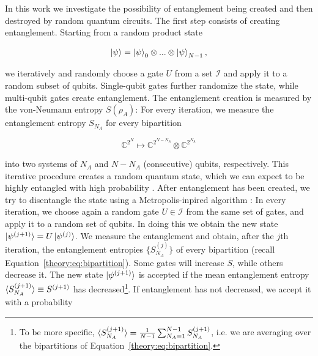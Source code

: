 \documentclass[reprint,amsmath,amssymb,aps,prb,nofootinbib]{revtex4-2}
\begin{document}
    \vspace{\baselineskip}

    In this work we investigate the possibility of entanglement being created and then destroyed by
    random quantum circuits. The first step consists of creating entanglement. Starting from a random product state

    \begin{equation}
        \ket{\psi}=\ket{\psi}_0\otimes...\otimes\ket{\psi}_{N-1},
    \end{equation}

    we iteratively and randomly choose a gate $U$ from a set $\mathcal{I}$ and apply it to a random subset of
    qubits. Single-qubit gates further randomize the state, while multi-qubit gates create entanglement. The
    entanglement creation is measured by the von-Neumann entropy $S(\rho_A)$: For every iteration, we measure
    the entanglement entropy $S_{N_A}$ for every bipartition

    \begin{equation}
        \mathbb{C}^{2^N}\mapsto\mathbb{C}^{2^{N-N_A}}\otimes\mathbb{C}^{2^{N_A}}
        \label{theory:eq:bipartition}
    \end{equation}

    into two systems of $N_A$ and $N-N_A$ (consecutive) qubits, respectively. This iterative procedure creates a random quantum state, which we can
    expect to be highly entangled with high probability \cite{Page:1993:AverageEntropy,Hamma:2012:RandomQuantumEntanglement}.
    After entanglement has been created, we try to disentangle the state using a Metropolis-inpired algorithm
    \cite{Shaffer:2014:IrreversibilityAndEntanglement,Odavic:2023:RandomUnitaries,Chamon:2014:EmergentIrreversibility}:
    In every iteration, we choose again a random gate $U\in\mathcal{I}$ from the same set of gates, and apply it to
    a random set of qubits. In doing this we obtain the new state $\ket{\psi^{(j+1)}}=U\ket{\psi^{(j)}}$. We measure
    the entanglement and obtain, after the $j$th iteration, the entanglement entropies $\{S_{N_A}^{(j)}\}$ of
    every bipartition (recall Equation~\ref{theory:eq:bipartition}). Some gates will increase $S$, while others
    decrease it. The new state $\ket{\psi^{(j+1)}}$ is accepted if the mean entanglement entropy $\braket{S_{N_A}^{(j+1)}}\equiv S^{(j+1)}$
    has decreased\footnote{To be more specific, $\braket{S_{N_A}^{(j+1)}}=\frac{1}{N-1}\sum_{N_A=1}^{N-1}S_{N_A}^{(j+1)}$,
    i.e. we are averaging over the bipartitions of Equation~\ref{theory:eq:bipartition}.}. If entanglement has not
    decreased, we accept it with a probability
\end{document}
